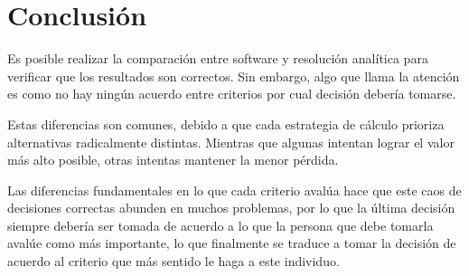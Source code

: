 \section{Conclusión}
Es posible realizar la comparación entre software y resolución analítica para verificar que los resultados son correctos. Sin embargo, algo que llama la atención es como no hay ningún acuerdo entre criterios por cual decisión debería tomarse.

Estas diferencias son comunes, debido a que cada estrategia de cálculo prioriza alternativas radicalmente distintas. Mientras que algunas intentan lograr el valor más alto posible, otras intentas mantener la menor pérdida.

Las diferencias fundamentales en lo que cada criterio avalúa hace que este caos de decisiones correctas abunden en muchos problemas, por lo que la última decisión siempre debería ser tomada de acuerdo a lo que la persona que debe tomarla avalúe como más importante, lo que finalmente se traduce a tomar la decisión de acuerdo al criterio que más sentido le haga a este individuo.
